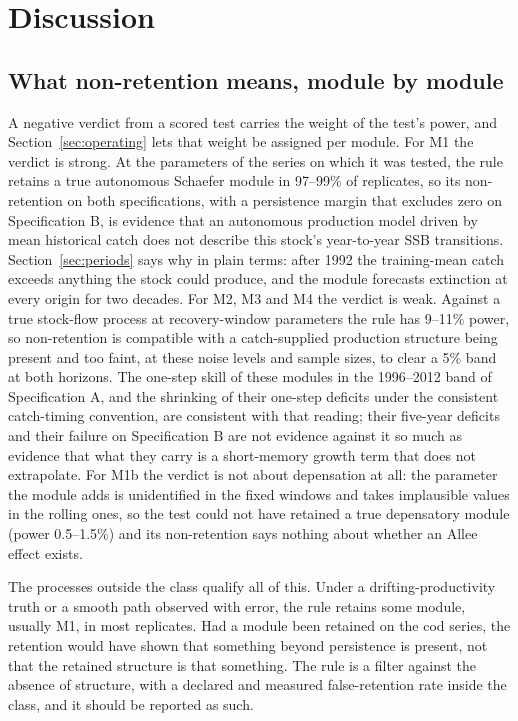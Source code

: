 \documentclass[preprint,11pt,authoryear]{elsarticle}
\theoremstyle{definition}
\theoremstyle{remark}
\begin{document}
\section{Discussion}\label{sec:discussion}

\subsection{What non-retention means, module by module}\label{sec:meaning}

A negative verdict from a scored test carries the weight of the test's power, and Section~\ref{sec:operating} lets that weight be assigned per module. For M1 the verdict is strong. At the parameters of the series on which it was tested, the rule retains a true autonomous Schaefer module in 97--99\% of replicates, so its non-retention on both specifications, with a persistence margin that excludes zero on Specification B, is evidence that an autonomous production model driven by mean historical catch does not describe this stock's year-to-year SSB transitions. Section~\ref{sec:periods} says why in plain terms: after 1992 the training-mean catch exceeds anything the stock could produce, and the module forecasts extinction at every origin for two decades. For M2, M3 and M4 the verdict is weak. Against a true stock-flow process at recovery-window parameters the rule has 9--11\% power, so non-retention is compatible with a catch-supplied production structure being present and too faint, at these noise levels and sample sizes, to clear a 5\% band at both horizons. The one-step skill of these modules in the 1996--2012 band of Specification A, and the shrinking of their one-step deficits under the consistent catch-timing convention, are consistent with that reading; their five-year deficits and their failure on Specification B are not evidence against it so much as evidence that what they carry is a short-memory growth term that does not extrapolate. For M1b the verdict is not about depensation at all: the parameter the module adds is unidentified in the fixed windows and takes implausible values in the rolling ones, so the test could not have retained a true depensatory module (power 0.5--1.5\%) and its non-retention says nothing about whether an Allee effect exists.

The processes outside the class qualify all of this. Under a drifting-productivity truth or a smooth path observed with error, the rule retains some module, usually M1, in most replicates. Had a module been retained on the cod series, the retention would have shown that something beyond persistence is present, not that the retained structure is that something. The rule is a filter against the absence of structure, with a declared and measured false-retention rate inside the class, and it should be reported as such.
\end{document}
